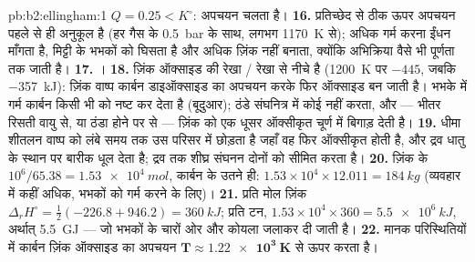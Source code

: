 \begin{solution}{pb:b2:ellingham:1}
$Q = 0.25 < K^\circ$: अपचयन चलता है।
\textbf{16.} प्रतिच्छेद से ठीक ऊपर अपचयन पहले से ही अनुकूल है (हर गैस के
\qty{0.5}{bar} के साथ, लगभग \qty{1170}{K} से); अधिक गर्म करना ईंधन माँगता है,
मिट्टी के भभकों को घिसता है और अधिक ज़िंक नहीं बनाता, क्योंकि अभिक्रिया वैसे भी
पूर्णता तक जाती है।
\textbf{17.} ।
\textbf{18.} ज़िंक ऑक्साइड की रेखा / रेखा से नीचे है
(\qty{1200}{K} पर $-445$, जबकि \qty{-357}{kJ}): ज़िंक वाष्प कार्बन
डाइऑक्साइड का अपचयन करके फिर ऑक्साइड बन जाती है। भभके में गर्म कार्बन किसी भी
 को नष्ट कर देता है (बूदुआर); ठंडे संघनित्र में कोई नहीं करता, और  --- भीतर
रिसती वायु से, या ठंडा होने पर  से --- ज़िंक को एक
धूसर ऑक्सीकृत चूर्ण में बिगाड़ देती है।
\textbf{19.} धीमा शीतलन वाष्प को लंबे समय तक उस परिसर में छोड़ता है जहाँ
वह फिर ऑक्सीकृत होती है, और द्रव धातु के स्थान पर बारीक धूल देता है; द्रव तक
शीघ्र संघनन दोनों को सीमित करता है।
\textbf{20.} ज़िंक के $10^6/65.38 = \qty{1.53e4}{mol}$, कार्बन के उतने ही:
$1.53 \times 10^4 \times 12.011 = \qty{184}{kg}$ (व्यवहार में कहीं अधिक, भभकों को
गर्म करने के लिए)।
\textbf{21.} प्रति मोल ज़िंक $\Delta_r H^\circ = \frac12(-226.8 + 946.2) = \qty{+360}{kJ}$;
प्रति टन, $1.53 \times 10^4 \times 360 = \qty{5.5e6}{kJ}$, अर्थात्
\qty{5.5}{GJ} --- जो भभकों के चारों ओर और कोयला जलाकर दी जाती है।
\textbf{22.} मानक परिस्थितियों में कार्बन ज़िंक ऑक्साइड का अपचयन
$\boldsymbol{T \approx \qty{1.22e3}{K}}$ से ऊपर करता है।
\end{solution}
